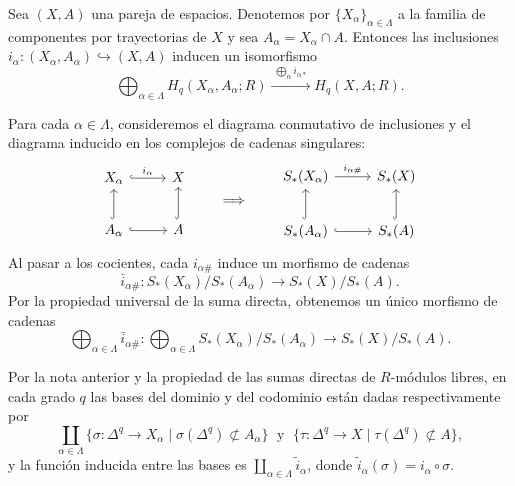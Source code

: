 \begin{prop}
Sea $(X, A)$ una pareja de espacios. Denotemos por $\{X_\alpha\}_{\alpha \in \Lambda}$ a la familia de componentes por trayectorias de $X$ y sea $A_\alpha = X_\alpha \cap A$. Entonces las inclusiones $i_\alpha \colon (X_\alpha, A_\alpha) \hookrightarrow (X, A)$ inducen un isomorfismo
\[
\bigoplus_{\alpha \in \Lambda} H_q(X_\alpha, A_\alpha; R) \xrightarrow{\;\bigoplus_\alpha i_{\alpha*}\;} H_q(X, A; R).
\]
\end{prop}

\begin{dem}
Para cada $\alpha \in \Lambda$, consideremos el diagrama conmutativo de inclusiones y el diagrama inducido en los complejos de cadenas singulares:
\[
\begin{tikzcd}[column sep=2.6em, row sep=2.2em]
X_\alpha \arrow[r, hook, "i_\alpha"] & X \\
A_\alpha \arrow[u, hook] \arrow[r, hook] & A \arrow[u, hook]
\end{tikzcd}
\hspace{2em} \Longrightarrow \hspace{2em}
\begin{tikzcd}[column sep=2.6em, row sep=2.2em]
S_*(X_\alpha) \arrow[r, "i_{\alpha\#}"] & S_*(X) \\
S_*(A_\alpha) \arrow[u, hook] \arrow[r, hook] & S_*(A) \arrow[u, hook]
\end{tikzcd}
\]
Al pasar a los cocientes, cada $i_{\alpha\#}$ induce un morfismo de cadenas
\[
\bar{i}_{\alpha\#} \colon S_*(X_\alpha)/S_*(A_\alpha) \longrightarrow S_*(X)/S_*(A).
\]
Por la propiedad universal de la suma directa, obtenemos un único morfismo de cadenas
\[
\bigoplus_{\alpha \in \Lambda} \bar{i}_{\alpha\#} \colon \bigoplus_{\alpha \in \Lambda} S_*(X_\alpha)/S_*(A_\alpha) \longrightarrow S_*(X)/S_*(A).
\]

Por la nota anterior y la propiedad de las sumas directas de $R$-módulos libres, en cada grado $q$ las bases del dominio y del codominio están dadas respectivamente por
\[
\coprod_{\alpha \in \Lambda} \{ \sigma \colon \Delta^q \to X_\alpha \mid \sigma(\Delta^q) \not\subset A_\alpha \}
\; \text{ y } \;
\{ \tau \colon \Delta^q \to X \mid \tau(\Delta^q) \not\subset A \},
\]
y la función inducida entre las bases es $\coprod_{\alpha \in \Lambda} \tilde{i}_\alpha$, donde $\tilde{i}_\alpha(\sigma) = i_\alpha \circ \sigma$.


\end{dem}
